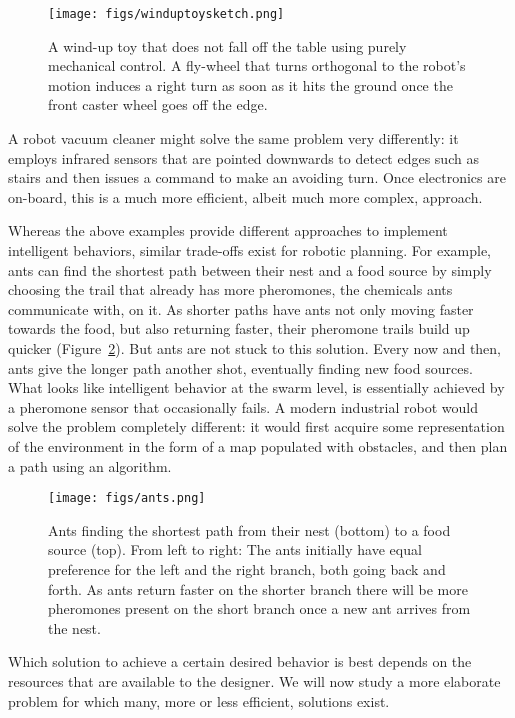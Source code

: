\begin{figure}
	\centering
		\texttt{[image: figs/winduptoysketch.png]}
	\caption{A wind-up toy that does not fall off the table using purely mechanical control. A fly-wheel that turns orthogonal to the robot's motion induces a right turn as soon as it hits the ground once the front caster wheel goes off the edge.}
	\label{fig:winduptoy}
\end{figure}

A robot vacuum cleaner might solve the same problem very differently: it employs infrared sensors that are pointed downwards to detect edges such as stairs and then issues a command to make an avoiding turn. Once electronics are on-board, this is a much more efficient, albeit much more complex, approach.

Whereas the above examples provide different approaches to implement intelligent behaviors, similar trade-offs exist for robotic planning. For example, ants can find the shortest path between their nest and a food source by simply choosing the trail that already has more pheromones, the chemicals ants communicate with, on it. As shorter paths have ants not only moving faster towards the food, but also returning faster, their pheromone trails build up quicker (Figure~\ref{fig:ants}). But ants are not stuck to this solution. Every now and then, ants give the longer path another shot, eventually finding new food sources. What looks like intelligent behavior at the swarm level, is essentially achieved by a pheromone sensor that occasionally fails. A modern industrial robot would solve the problem completely different: it would first acquire some representation of the environment in the form of a map populated with obstacles, and then plan a path using an algorithm.

\begin{figure}
	\centering
		\texttt{[image: figs/ants.png]}
	\caption{Ants finding the shortest path from their nest (bottom) to a food source (top). From left to right: The ants initially have equal preference for the left and the right branch, both going back and forth. As ants return faster on the shorter branch there will be more pheromones present on the short branch once a new ant arrives from the nest.}
	\label{fig:ants}
\end{figure}

Which solution to achieve a certain desired behavior is best depends on the resources that are available to the designer. We will now study a more elaborate problem for which many, more or less efficient, solutions exist.

